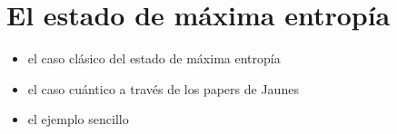 \section{El estado de máxima entropía}\label{sec:CH1MaxEnt}
\begin{itemize}
\item el caso clásico del estado de máxima entropía
\item el caso cuántico a través de los papers de Jaunes
\item el ejemplo sencillo
\end{itemize}

